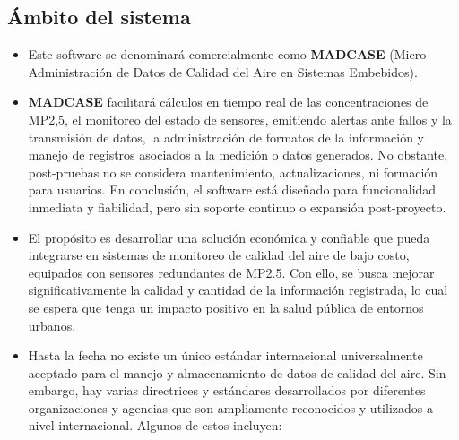 \documentclass[
11pt, %
codirector, %
]{charter}
\begin{document}
\subsection{Ámbito del sistema}
\label{sec:org12e44a1}

\begin{itemize}
	\item Este software se denominará comercialmente como \textbf{MADCASE} (Micro Administración de Datos de Calidad del Aire en Sistemas Embebidos).
	
	\item \textbf{MADCASE} facilitará cálculos en tiempo real de las concentraciones de MP2,5, el monitoreo del estado de sensores, emitiendo alertas ante fallos y la transmisión de datos, la administración de formatos de la información y manejo de registros asociados a la medición o datos generados. No obstante, post-pruebas no se considera mantenimiento, actualizaciones, ni formación para usuarios. En conclusión, el software está diseñado para funcionalidad inmediata y fiabilidad, pero sin soporte continuo o expansión post-proyecto.
	
	\item El propósito es desarrollar una solución económica y confiable que pueda integrarse en sistemas de monitoreo de calidad del aire de bajo costo, equipados con sensores redundantes de MP2.5. Con ello, se busca mejorar significativamente la calidad y cantidad de la información registrada, lo cual se espera que tenga un impacto positivo en la salud pública de entornos urbanos.

	
	\item Hasta la fecha no existe un único estándar internacional universalmente aceptado para el manejo y almacenamiento de datos de calidad del aire. Sin embargo, hay varias directrices y estándares desarrollados por diferentes organizaciones y agencias que son ampliamente reconocidos y utilizados a nivel internacional. Algunos de estos incluyen:
	

\end{itemize}
\end{document}
